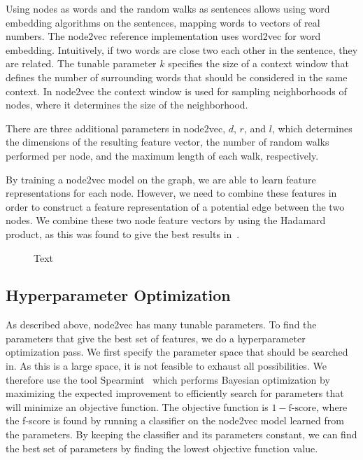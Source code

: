 Using nodes as words and the random walks as sentences allows using word embedding algorithms on the sentences, mapping words to vectors of real numbers. The node2vec reference implementation uses word2vec for word embedding. Intuitively, if two words are close two each other in the sentence, they are related. The tunable parameter $k$ specifies the size of a context window that defines the number of surrounding words that should be considered in the same context. In node2vec the context window is used for sampling neighborhoods of nodes, where it determines the size of the neighborhood.

There are three additional parameters in node2vec, $d$, $r$, and $l$, which determines the dimensions of the resulting feature vector, the number of random walks performed per node, and the maximum length of each walk, respectively.

By training a node2vec model on the graph, we are able to learn feature representations for each node. However, we need to combine these features in order to construct a feature representation of a potential edge between the two nodes. We combine these two node feature vectors by using the Hadamard product, as this was found to give the best results in~\cite{node2vec}.


\begin{figure}[tbp]%
  \centering
  

\caption[short desc]{Text}%
\label{fig:n2v-figure}%
\end{figure}


\subsection{Hyperparameter Optimization}
As described above, node2vec has many tunable parameters. To find the parameters that give the best set of features, we do a hyperparameter optimization pass. We first specify the parameter space that should be searched in. As this is a large space, it is not feasible to exhaust all possibilities. We therefore use the tool Spearmint~\cite{snoek2012practical} which performs Bayesian optimization by maximizing the expected improvement to efficiently search for parameters that will minimize an objective function. The objective function is $1 - \text{f-score}$, where the f-score is found by running a classifier on the node2vec model learned from the parameters. By keeping the classifier and its parameters constant, we can find the best set of parameters by finding the lowest objective function value.

